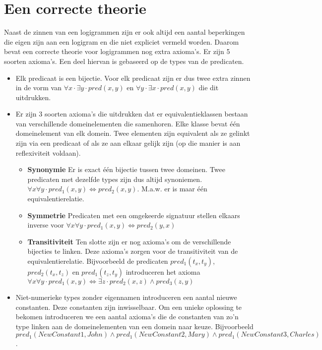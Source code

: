 
\section{Een correcte theorie}
Naast de zinnen van een logigrammen zijn er ook altijd een aantal beperkingen die eigen zijn aan een logigram en die niet expliciet vermeld worden. Daarom bevat een correcte theorie voor logigrammen nog extra axioma's. Er zijn 5 soorten axioma's. Een deel hiervan is gebaseerd op de types van de predicaten.

\begin{itemize}
  \item Elk predicaat is een bijectie. Voor elk predicaat zijn er dus twee extra zinnen in de vorm van $\forall x \cdot \exists y \cdot pred(x, y)$ en $\forall y \cdot \exists x \cdot pred(x, y)$ die dit uitdrukken.
  \item Er zijn 3 soorten axioma's die uitdrukken dat er equivalentieklassen bestaan van verschillende domeinelementen die samenhoren. Elke klasse bevat één domeinelement van elk domein. Twee elementen zijn equivalent als ze gelinkt zijn via een predicaat of als ze aan elkaar gelijk zijn (op die manier is aan reflexiviteit voldaan).
    \begin{itemize}
      \item \textbf{Synonymie} Er is exact één bijectie tussen twee domeinen. Twee predicaten met dezelfde types zijn dus altijd synoniemen. $\forall x \forall y \cdot pred_1(x, y) \Leftrightarrow pred_2(x, y)$. M.a.w. er is maar één equivalentierelatie.
      \item \textbf{Symmetrie} Predicaten met een omgekeerde signatuur stellen elkaars inverse voor $\forall x \forall y \cdot pred_1(x, y) \Leftrightarrow pred_2(y, x)$
      \item \textbf{Transitiviteit} Ten slotte zijn er nog axioma's om de verschillende bijecties te linken. Deze axioma's zorgen voor de transitiviteit van de equivalentierelatie. Bijvoorbeeld de predicaten $pred_1(t_x, t_y)$, $pred_2(t_x, t_z)$ en $pred_1(t_z, t_y)$ introduceren het axioma $\forall x \forall y \cdot pred_1(x, y) \Leftrightarrow \exists z \cdot pred_2(x, z) \land pred_3(z, y)$
    \end{itemize}
  \item Niet-numerieke types zonder eigennamen introduceren een aantal nieuwe constanten. Deze constanten zijn inwisselbaar. Om een unieke oplossing te bekomen introduceren we een aantal axioma's die de constanten van zo'n type linken aan de domeinelementen van een domein naar keuze. Bijvoorbeeld $pred_1(NewConstant1, John) \land pred_1(NewConstant2, Mary) \land pred_1(NewConstant3, Charles)$.
\end{itemize}


